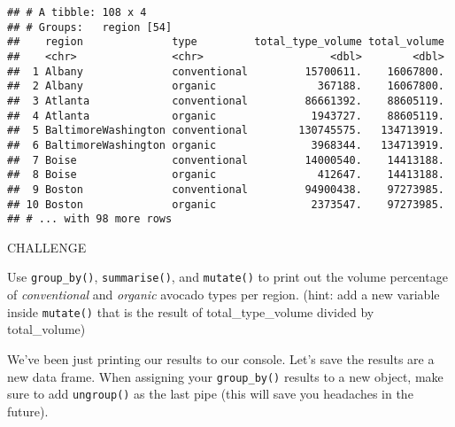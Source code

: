 \documentclass[]{book}
\newenvironment{Shaded}{\begin{snugshade}}{\end{snugshade}}
\newcommand{\DataTypeTok}[1]{\textcolor[rgb]{0.13,0.29,0.53}{#1}}
\newcommand{\KeywordTok}[1]{\textcolor[rgb]{0.13,0.29,0.53}{\textbf{#1}}}
\newcommand{\NormalTok}[1]{#1}
\newcommand{\OperatorTok}[1]{\textcolor[rgb]{0.81,0.36,0.00}{\textbf{#1}}}
\newcommand{\StringTok}[1]{\textcolor[rgb]{0.31,0.60,0.02}{#1}}
\begin{document}
\begin{Shaded}
\end{Shaded}

\begin{verbatim}
## # A tibble: 108 x 4
## # Groups:   region [54]
##    region              type         total_type_volume total_volume
##    <chr>               <chr>                    <dbl>        <dbl>
##  1 Albany              conventional         15700611.    16067800.
##  2 Albany              organic                367188.    16067800.
##  3 Atlanta             conventional         86661392.    88605119.
##  4 Atlanta             organic               1943727.    88605119.
##  5 BaltimoreWashington conventional        130745575.   134713919.
##  6 BaltimoreWashington organic               3968344.   134713919.
##  7 Boise               conventional         14000540.    14413188.
##  8 Boise               organic                412647.    14413188.
##  9 Boston              conventional         94900438.    97273985.
## 10 Boston              organic               2373547.    97273985.
## # ... with 98 more rows
\end{verbatim}

\leavevmode\hypertarget{challenge}{}%
CHALLENGE

Use \texttt{group\_by()}, \texttt{summarise()}, and \texttt{mutate()} to print out the volume percentage of \emph{conventional} and \emph{organic} avocado types per region. (hint: add a new variable inside \texttt{mutate()} that is the result of total\_type\_volume divided by total\_volume)

We've been just printing our results to our console. Let's save the results are a new data frame. When assigning your \texttt{group\_by()} results to a new object, make sure to add \texttt{ungroup()} as the last pipe (this will save you headaches in the future).
\end{document}
